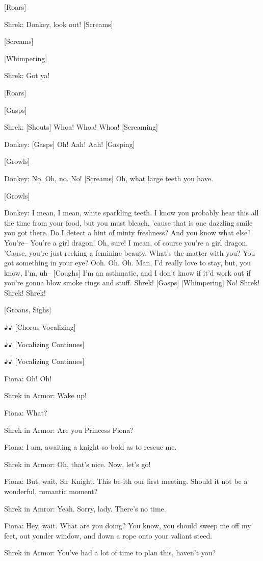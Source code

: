 \documentclass{article}
\begin{document}
[Roars]

Shrek:
Donkey, look out! [Screams]

[Screams]

[Whimpering]

Shrek:
Got ya!

[Roars]

[Gasps]

Shrek:
[Shouts] Whoa! Whoa! Whoa! [Screaming]

Donkey:
[Gasps] Oh! Aah! Aah! [Gasping]

[Growls]

Donkey:
No. Oh, no. No! [Screams] Oh, what large teeth you have.

[Growls]

Donkey:
I mean, I mean, white sparkling teeth. I know you probably hear this all the time from your food, but you must bleach, 'cause that is one dazzling smile you got there. Do I detect a hint of minty freshness? And you know what else? You're-- You're a girl dragon! Oh, sure! I mean, of course you're a girl dragon. 'Cause, you're just reeking a feminine beauty. What's the matter with you? You got something in your eye? Ooh. Oh. Oh. Man, I'd really love to stay, but, you know, I'm, uh-- [Coughs] I'm an asthmatic, and I don't know if it'd work out if you're gonna blow smoke rings and stuff. Shrek! [Gasps] [Whimpering] No! Shrek! Shrek! Shrek!

[Groans, Sighs]

♪♪ [Chorus Vocalizing]

♪♪ [Vocalizing Continues]

♪♪ [Vocalizing Continues]

Fiona:
Oh! Oh!

Shrek in Armor:
Wake up!

Fiona:
What?

Shrek in Armor:
Are you Princess Fiona?

Fiona:
I am, awaiting a knight so bold as to rescue me.

Shrek in Armor:
Oh, that's nice. Now, let's go!

Fiona:
But, wait, Sir Knight. This be-ith our first meeting. Should it not be a wonderful, romantic moment?

Shrek in Amror:
Yeah. Sorry, lady. There's no time.

Fiona:
Hey, wait. What are you doing? You know, you should sweep me off my feet, out yonder window, and down a rope onto your valiant steed.

Shrek in Armor:
You've had a lot of time to plan this, haven't you?
\end{document}
